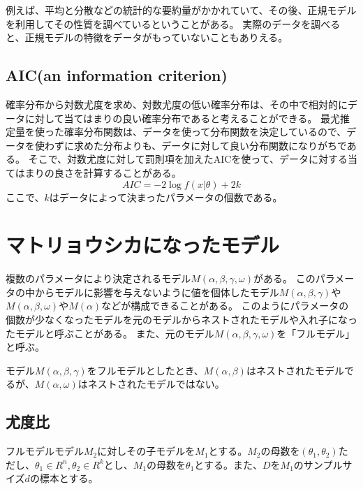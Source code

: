 例えば、平均と分散などの統計的な要約量がかかれていて、その後、正規モデルを利用してその性質を調べているということがある。
実際のデータを調べると、正規モデルの特徴をデータがもっていないこともありえる。


\subsection{AIC(an information criterion)}
確率分布から対数尤度を求め、対数尤度の低い確率分布は、その中で相対的にデータに対して当てはまりの良い確率分布であると考えることができる。
最尤推定量を使った確率分布関数は、データを使って分布関数を決定しているので、データを使わずに求めた分布よりも、データに対して良い分布関数になりがちである。
そこで、対数尤度に対して罰則項を加えたAICを使って、データに対する当てはまりの良さを計算することがある。
\begin{equation*}
    AIC = -2\log f(x|\theta)+2k
\end{equation*}
ここで、$k$はデータによって決まったパラメータの個数である。

\section{マトリョウシカになったモデル}
複数のパラメータにより決定されるモデル$M(\alpha,\beta,\gamma,\omega)$がある。
このパラメータの中からモデルに影響を与えないように値を個体したモデル$M(\alpha,\beta,\gamma)$や$M(\alpha,\beta,\omega)$や$M(\alpha)$などが構成できることがある。
このようにパラメータの個数が少なくなったモデルを元のモデルからネストされたモデルや入れ子になったモデルと呼ぶことがある。
また、元のモデル$M(\alpha,\beta,\gamma,\omega)$を「フルモデル」と呼ぶ。

モデル$M(\alpha,\beta,\gamma)$をフルモデルとしたとき、$M(
\alpha,\beta)$はネストされたモデルでるが、$M(\alpha,\omega)$はネストされたモデルではない。

\subsection{尤度比}
フルモデルモデル$M_2$に対しその子モデルを$M_1$とする。$M_2$の母数を$(\theta_1,\theta_2)$ただし、$\theta_1\in R^n,\theta_2\in R^k$とし、$M_1$の母数を$\theta_1$とする。また、$D$を$M_1$のサンプルサイズ$d$の標本とする。

